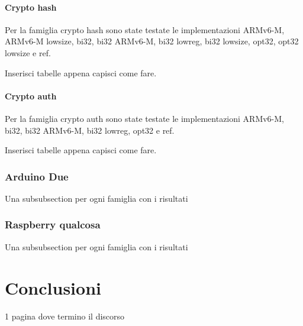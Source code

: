 \documentclass{report}
\begin{document}

\subsubsection{Crypto hash}

Per la famiglia crypto hash sono state testate le implementazioni ARMv6-M, ARMv6-M lowsize, bi32, bi32 ARMv6-M, bi32 lowreg, bi32 lowsize, opt32, opt32 lowsize e ref.

Inserisci tabelle appena capisci come fare.

\subsubsection{Crypto auth}

Per la famiglia crypto auth sono state testate le implementazioni ARMv6-M, bi32, bi32 ARMv6-M, bi32 lowreg, opt32 e ref.

Inserisci tabelle appena capisci come fare.

\subsection{Arduino Due}

Una subsubsection per ogni famiglia con i risultati

\subsection{Raspberry qualcosa}

Una subsubsection per ogni famiglia con i risultati

\newpage

\chapter{Conclusioni}

1 pagina dove termino il discorso

\newpage

\printbibliography
\end{document}
